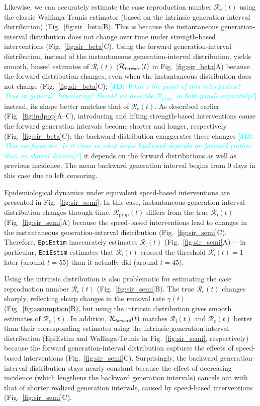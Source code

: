 \documentclass[12pt]{article}
\newcommand{\comment}{\showcomment}
\newcommand{\showcomment}[3]{\textcolor{#1}{\textbf{[#2: }\textsl{#3}\textbf{]}}}
\newcommand{\jd}[1]{\comment{cyan}{JD}{#1}}
\newcommand{\fref}[1]{Fig.~\ref{fig:#1}}
\newcommand{\Rx}[1]{\ensuremath{{\mathcal R}_{#1}}\xspace}
\newcommand{\Rc}{\Rx{\mathrm{c}}}
\newcommand{\Ri}{\Rx{\mathrm{i}}}
\newcommand{\RR}{\ensuremath{{\mathcal R}}\xspace}
\newcommand{\Rprop}{\Rx{\mathrm{prop}}}
\newcommand{\tsub}[2]{#1_{{\textrm{\tiny #2}}}}
\begin{document}
Likewise, we can accurately estimate the case reproduction number $\Rc(t)$ using the classic Wallinga-Teunis estimator (based on the intrinsic generation-interval distribution) (\fref{sir_beta}B).
This is because the instantaneous generation-interval distribution does not change over time under strength-based interventions (\fref{sir_beta}C).
Using the forward generation-interval distribution, instead of the instantaneous generation-interval distribution, yields smooth, biased estimates of $\Ri(t)$ ($\tsub{\RR}{forward}(t)$ in \fref{sir_beta}A) because the forward distribution changes, even when the instantaneous distribution does not change (\fref{sir_beta}C);
\jd{What's the point of this interjection? True in general? Interesting? Should we describe \Rprop\ in both panels separately?} instead, its shape better matches that of $\Rc(t)$.
As described earlier (\fref{indpop}A--C), introducing and lifting strength-based interventions cause the forward generation intervals become shorter and longer, respectively (\fref{sir_beta}C);
the backward distribution exaggerates these changes \jd{This confuses me. Is it clear in what sense backward depends on forward (rather than on shared drivers)?} it depends on the forward distributions as well as previous incidence.
The mean backward generation interval begins from 0 days in this case due to left censoring.

Epidemiological dynamics under equivalent speed-based interventions are presented in \fref{sir_semi}.
In this case, instantaneous generation-interval distribution changes through time.  
$\Rprop(t)$ differs from the true $\Ri(t)$ (\fref{sir_semi}A) because the speed-based interventions lead to changes in the instantaneous generation-interval distribution (\fref{sir_semi}C).
Therefore, \texttt{EpiEstim} inaccurately estimates $\Ri(t)$ (\fref{sir_semi}A)---
in particular, \texttt{EpiEstim} estimates that $\Ri(t)$ crossed the threshold $\Ri(t)=1$ later (around $t=55$) than it actually did (around $t=45$).

Using the intrinsic distribution is also problematic for estimating the case reproduction number $\Rc(t)$ (\fref{sir_semi}B).
The true $\Rc(t)$ changes sharply, reflecting sharp changes in the removal rate $\gamma(t)$ (\fref{assumption}B), but using the intrinsic distribution gives smooth estimates of $\Rc(t)$.
In addition, $\tsub{\RR}{forward}(t)$ matches $\Ri(t)$ and $\Rc(t)$ better than their corresponding estimates using the intrinsic generation-interval distribution (EpiEstim and Wallinga-Teunis in \fref{sir_semi}, respectively) because the forward generation-interval distribution captures the effects of speed-based interventions (\fref{sir_semi}C).
Surprisingly, the backward generation-interval distribution stays nearly constant because the effect of decreasing incidence (which lengthens the backward generation intervals) cancels out with that of shorter realized generation intervals, caused by speed-based interventions (\fref{sir_semi}C).
\end{document}
